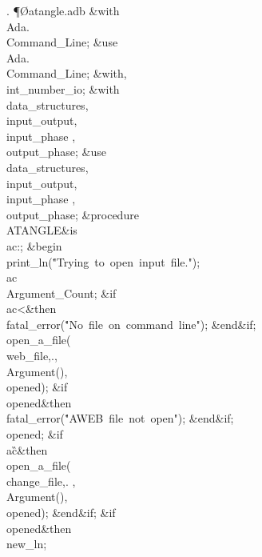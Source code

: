 \*.
\Y\P\O{atangle.adb}\?\6
\?\&{with}\8\\{Ada}\?.\?\\{Command\_Line};\6
\&{use}\8\\{Ada}\?.\?\\{Command\_Line};\6
\&{with}\8\?,\?\\{int\_number\_io};\6
\&{with}\8\\{data\_structures}\?,\?\\{input\_output}\?,\?\\{input\_phase}%
\?,\?\\{output\_phase};\6
\&{use}\8\\{data\_structures}\?,\?\\{input\_output}\?,\?\\{input\_phase}%
\?,\?\\{output\_phase};\6
\&{procedure}\8\1\\{ATANGLE}\2\8\&{is}\8\1\6
\\{ac}\?:\?\?\K{};\6
\4\&{begin}\6
\\{print\_ln}\?\1(\?\.{"Trying\ to\ open\ input\ file."}\?\2)\?;\5
\\{ac}\?\K\?\\{Argument\_Count};\6
\&{if}\1\1\8\\{ac}\?<\2\8\&{then}\6
\\{fatal\_error}\?\1(\?\.{"No\ file\ on\ command\ line"}\?\2)\?;\2\6
\&{end}\8\2\&{if}\1;\6
\\{open\_a\_file}\?\1(\?\\{web\_file}\?,\?\?.\?\?,%
\?\\{Argument}\?\1(\?\2),\?\\{opened}\?\2)\?;\6
\&{if}\1\1\?\8\R\?\\{opened}\2\8\&{then}\6
\\{fatal\_error}\?\1(\?\.{"AWEB\ file\ not\ open"}\?\2)\?;\2\6
\&{end}\8\2\&{if}\1;\6
\\{opened}\?\K\?;\6
\&{if}\1\1\8\\{ac}\?\G{}\2\8\&{then}\6
\\{open\_a\_file}\?\1(\?\\{change\_file}\?,\?\?.\?%
\?,\?\\{Argument}\?\1(\?\2),\?\\{opened}\?\2)\?;\2\6
\&{end}\8\2\&{if}\1;\6
\&{if}\1\1\?\8\R\?\\{opened}\2\8\&{then}\6
\\{new\_ln};\5
